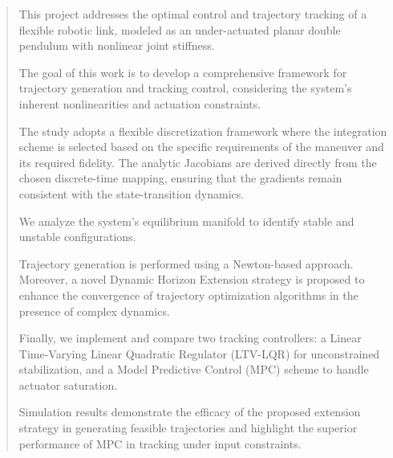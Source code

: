 \begin{abstract}

This project addresses the optimal control and trajectory tracking of a flexible robotic link, modeled as an under-actuated planar double pendulum with nonlinear joint stiffness.

The goal of this work is to develop a comprehensive framework for trajectory generation and tracking control, considering the system's inherent nonlinearities and actuation constraints.

The study adopts a flexible discretization framework where the integration scheme is selected based on the specific requirements of the maneuver and its required fidelity. The analytic Jacobians are derived directly from the chosen discrete-time mapping, ensuring that the gradients remain consistent with the state-transition dynamics.

We analyze the system's equilibrium manifold to identify stable and unstable configurations. 

Trajectory generation is performed using a Newton-based approach.  Moreover, a novel Dynamic Horizon Extension strategy is proposed to enhance the convergence of trajectory optimization algorithms in the presence of complex dynamics.

Finally, we implement and compare two tracking controllers: a Linear Time-Varying Linear Quadratic Regulator (LTV-LQR) for unconstrained stabilization, and a Model Predictive Control (MPC) scheme to handle actuator saturation. 

Simulation results demonstrate the efficacy of the proposed extension strategy in generating feasible trajectories and highlight the superior performance of MPC in tracking under input constraints.

\end{abstract}
\newpage